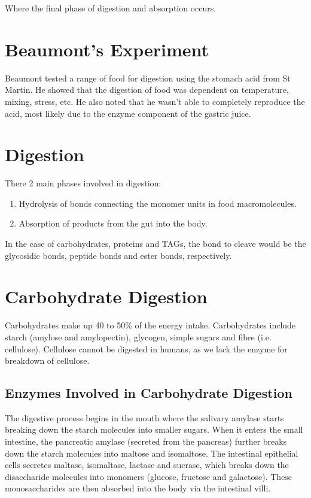 Where the final phase of digestion and absorption occurs.

\section{Beaumont's Experiment}

Beaumont tested a range of food for digestion using the stomach acid from St Martin.
He showed that the digestion of food was dependent on temperature, mixing, stress, etc.
He also noted that he wasn't able to completely reproduce the acid, most likely due to the enzyme component of the gastric juice.

\section{Digestion}

There 2 main phases involved in digestion:
\begin{enumerate}
\item Hydrolysis of bonds connecting the monomer units in food macromolecules.
\item Absorption of products from the gut into the body.
\end{enumerate}

In the case of carbohydrates, proteins and TAGs, the bond to cleave would be the glycosidic bonds, peptide bonds and ester bonds, respectively.

\section{Carbohydrate Digestion}

Carbohydrates make up 40 to 50\% of the energy intake.
Carbohydrates include starch (amylose and amylopectin), glycogen, simple sugars and fibre (i.e. cellulose).
Cellulose cannot be digested in humans, as we lack the enzyme for breakdown of cellulose.

\subsection{Enzymes Involved in Carbohydrate Digestion}

The digestive process begins in the mouth where the salivary amylase starts breaking down the starch molecules into smaller sugars.
When it enters the small intestine, the pancreatic amylase (secreted from the pancreas) further breaks down the starch molecules into maltose and isomaltose.
The intestinal epithelial cells secretes maltase, isomaltase, lactase and sucrase, which breaks down the disaccharide molecules into monomers (glucose, fructose and galactose).
These monosaccharides are then absorbed into the body via the intestinal villi.

